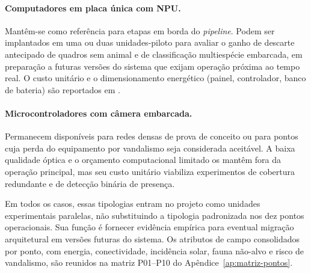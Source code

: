 \paragraph*{Computadores em placa única com NPU.}
Mantêm-se como referência para etapas em borda do \textit{pipeline}. Podem ser implantados em uma ou duas unidades-piloto para avaliar o ganho de descarte antecipado de quadros sem animal e de classificação multiespécie embarcada, em preparação a futuras versões do sistema que exijam operação próxima ao tempo real. O custo unitário e o dimensionamento energético (painel, controlador, banco de bateria) são reportados em \cite{velasco2024smartcameratraps,pishdast2025smartcameratraps,sargent2021raspberrypi}.


\paragraph*{Microcontroladores com câmera embarcada.}
Permanecem disponíveis para redes densas de prova de conceito ou para pontos cuja perda do equipamento por vandalismo seja considerada aceitável. A baixa qualidade óptica e o orçamento computacional limitado os mantêm fora da operação principal, mas seu custo unitário viabiliza experimentos de cobertura redundante e de detecção binária de presença.


Em todos os casos, essas tipologias entram no projeto como unidades experimentais paralelas, não substituindo a tipologia padronizada nos dez pontos operacionais. Sua função é fornecer evidência empírica para eventual migração arquitetural em versões futuras do sistema. Os atributos de campo consolidados por ponto, com energia, conectividade, incidência solar, fauna não-alvo e risco de vandalismo, são reunidos na matriz P01--P10 do Apêndice~\ref{ap:matriz-pontos}.
